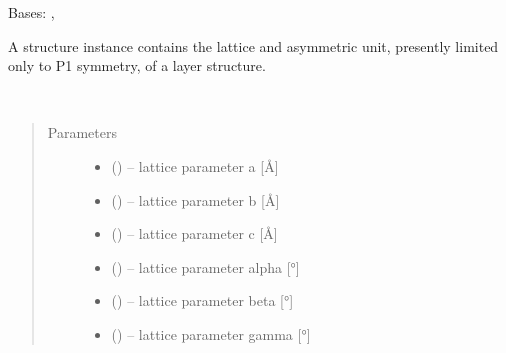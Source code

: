 \documentclass[letterpaper,10pt,english]{sphinxmanual}
\begin{document}
\begin{fulllineitems}
\label{\detokenize{rst/structure:mstack.structure.Structure}}
Bases: {\hyperref[\detokenize{rst/utilities:mstack.utilities.UpdateMethods}]{}}, {\hyperref[\detokenize{rst/utilities:mstack.utilities.MergeParams}]{}}

A structure instance contains the lattice and asymmetric unit,
presently limited only to P1 symmetry, of a layer structure.

\begin{fulllineitems}
\label{\detokenize{rst/structure:mstack.structure.Structure.__init__}}~\begin{quote}\begin{description}
\item[{Parameters}] \leavevmode\begin{itemize}
\item {} 
 (\sphinxstyleliteralemphasis{*}) -- lattice parameter a {[}Å{]}

\item {} 
 (\sphinxstyleliteralemphasis{*}) -- lattice parameter b {[}Å{]}

\item {} 
 (\sphinxstyleliteralemphasis{*}) -- lattice parameter c {[}Å{]}

\item {} 
 (\sphinxstyleliteralemphasis{*}) -- lattice parameter alpha {[}°{]}   

\item {} 
 (\sphinxstyleliteralemphasis{*}) -- lattice parameter beta {[}°{]}   

\item {} 
 (\sphinxstyleliteralemphasis{*}) -- lattice parameter gamma {[}°{]}   


\end{itemize}
\end{description}
\end{quote}
\end{fulllineitems}
\end{fulllineitems}
\end{document}
